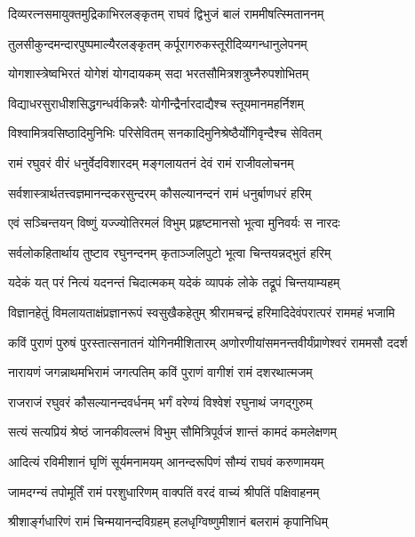 \twolineshloka
{दिव्यरत्नसमायुक्तमुद्रिकाभिरलङ्कृतम्}
{राघवं द्विभुजं बालं राममीषत्स्मिताननम्}%

\twolineshloka
{तुलसीकुन्दमन्दारपुष्पमाल्यैरलङ्कृतम्}
{कर्पूरागरुकस्तूरीदिव्यगन्धानुलेपनम्}%

\twolineshloka
{योगशास्त्रेष्वभिरतं योगेशं योगदायकम्}
{सदा भरतसौमित्रशत्रुघ्नैरुपशोभितम्}%

\twolineshloka
{विद्याधरसुराधीशसिद्धगन्धर्वकिन्नरैः}
{योगीन्द्रैर्नारदाद्यैश्च स्तूयमानमहर्निशम्}%

\twolineshloka
{विश्वामित्रवसिष्ठादिमुनिभिः परिसेवितम्}
{सनकादिमुनिश्रेष्ठैर्योगिवृन्दैश्च सेवितम्}%

\twolineshloka
{रामं रघुवरं वीरं धनुर्वेदविशारदम्}
{मङ्गलायतनं देवं रामं राजीवलोचनम्}%

\twolineshloka
{सर्वशास्त्रार्थतत्त्वज्ञमानन्दकरसुन्दरम्}
{कौसल्यानन्दनं रामं धनुर्बाणधरं हरिम्}%

\twolineshloka
{एवं सञ्चिन्तयन् विष्णुं यज्ज्योतिरमलं विभुम्}
{प्रहृष्टमानसो भूत्वा मुनिवर्यः स नारदः}%

\twolineshloka
{सर्वलोकहितार्थाय तुष्टाव रघुनन्दनम्}
{कृताञ्जलिपुटो भूत्वा चिन्तयन्नद्भुतं हरिम्}%

\twolineshloka
{यदेकं यत् परं नित्यं यदनन्तं चिदात्मकम्}
{यदेकं व्यापकं लोके तद्रूपं चिन्तयाम्यहम्}%

\fourlineindentedshloka
{विज्ञानहेतुं विमलायताक्षं}{प्रज्ञानरूपं स्वसुखैकहेतुम्}
{श्रीरामचन्द्रं हरिमादिदेवं}{परात्परं राममहं भजामि}%

\fourlineindentedshloka
{कविं पुराणं पुरुषं पुरस्तात्}{सनातनं योगिनमीशितारम्}
{अणोरणीयांसमनन्तवीर्यं}{प्राणेश्वरं राममसौ ददर्श}%

\twolineshloka
{नारायणं जगन्नाथमभिरामं जगत्पतिम्}
{कविं पुराणं वागीशं रामं दशरथात्मजम्}%

\twolineshloka
{राजराजं रघुवरं कौसल्यानन्दवर्धनम्}
{भर्गं वरेण्यं विश्वेशं रघुनाथं जगद्गुरुम्}%

\twolineshloka
{सत्यं सत्यप्रियं श्रेष्ठं जानकीवल्लभं विभुम्}
{सौमित्रिपूर्वजं शान्तं कामदं कमलेक्षणम्}%

\twolineshloka
{आदित्यं रविमीशानं घृणिं सूर्यमनामयम्}
{आनन्दरूपिणं सौम्यं राघवं करुणामयम्}%

\twolineshloka
{जामदग्न्यं तपोमूर्तिं रामं परशुधारिणम्}
{वाक्पतिं वरदं वाच्यं श्रीपतिं पक्षिवाहनम्}%

\twolineshloka
{श्रीशार्ङ्गधारिणं रामं चिन्मयानन्दविग्रहम्}
{हलधृग्विष्णुमीशानं बलरामं कृपानिधिम्}%

